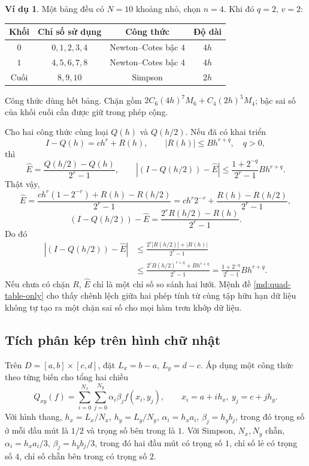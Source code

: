 \documentclass[12pt,a4paper,oneside]{book}
\numberwithin{algorithm}{chapter}
\theoremstyle{definition}
\newtheorem{vidu}{Ví dụ}[chapter]
\begin{document}
\begin{vidu}
Một bảng đều có $N=10$ khoảng nhỏ, chọn $n=4$. Khi đó $q=2$, $v=2$:
\begin{center}
\begin{tabular}{c|c|c|c}
\toprule
Khối & Chỉ số sử dụng & Công thức & Độ dài\\
\midrule
$0$ & $0,1,2,3,4$ & Newton--Cotes bậc $4$ & $4h$\\
$1$ & $4,5,6,7,8$ & Newton--Cotes bậc $4$ & $4h$\\
Cuối & $8,9,10$ & Simpson & $2h$\\
\bottomrule
\end{tabular}\end{center}
Công thức dùng hết bảng. Chặn gồm $2C_6(4h)^7M_6+C_4(2h)^5M_4$; bậc sai số của khối cuối cần được giữ trong phép cộng.
\end{vidu}

Cho hai công thức cùng loại $Q(h)$ và $Q(h/2)$. Nếu đã có khai triển
\[
 I-Q(h)=ch^r+R(h),\qquad |R(h)|\leq Bh^{r+q},\quad q>0,
\]
thì
\begin{equation}\label{eq:quad-refinement-indicator}
 \widehat E=\frac{Q(h/2)-Q(h)}{2^r-1},\qquad
 \left|(I-Q(h/2))-\widehat E\right|
 \leq\frac{1+2^{-q}}{2^r-1}Bh^{r+q}.
\end{equation}
Thật vậy,
\[
 \widehat E=\frac{ch^r(1-2^{-r})+R(h)-R(h/2)}{2^r-1}
 =ch^r2^{-r}+\frac{R(h)-R(h/2)}{2^r-1},
\]
\[
 (I-Q(h/2))-\widehat E=\frac{2^rR(h/2)-R(h)}{2^r-1}.
\]
Do đó
\begin{align*}
 \left|(I-Q(h/2))-\widehat E\right|
 &\leq\frac{2^r|R(h/2)|+|R(h)|}{2^r-1}\\
 &\leq\frac{2^rB(h/2)^{r+q}+Bh^{r+q}}{2^r-1}
 =\frac{1+2^{-q}}{2^r-1}Bh^{r+q}.
\end{align*}
Nếu chưa có chặn $R$, $\widehat E$ chỉ là một chỉ số so sánh hai lưới. Mệnh đề \ref{md:quad-table-only} cho thấy chênh lệch giữa hai phép tính từ cùng tập hữu hạn dữ liệu không tự tạo ra một chặn sai số cho mọi hàm trơn khớp dữ liệu.

\subsection{Tích phân kép trên hình chữ nhật}
Trên $D=[a,b]\times[c,d]$, đặt $L_x=b-a$, $L_y=d-c$. Áp dụng một công thức theo từng biến cho tổng hai chiều
\begin{equation}\label{eq:quad-tensor}
 Q_{xy}(f)=\sum_{i=0}^{N_x}\sum_{j=0}^{N_y}\alpha_i\beta_jf(x_i,y_j),
 \qquad x_i=a+ih_x,\ y_j=c+jh_y.
\end{equation}
Với hình thang, $h_x=L_x/N_x$, $h_y=L_y/N_y$, $\alpha_i=h_x a_i$, $\beta_j=h_yb_j$, trong đó trọng số ở mỗi đầu mút là $1/2$ và trọng số bên trong là $1$. Với Simpson, $N_x,N_y$ chẵn, $\alpha_i=h_xa_i/3$, $\beta_j=h_yb_j/3$, trong đó hai đầu mút có trọng số $1$, chỉ số lẻ có trọng số $4$, chỉ số chẵn bên trong có trọng số $2$.
\end{document}
